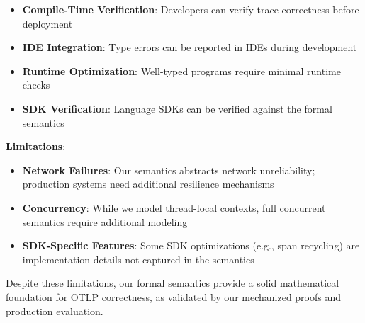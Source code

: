 \begin{itemize}
\item \textbf{Compile-Time Verification}: Developers can verify trace correctness before deployment
\item \textbf{IDE Integration}: Type errors can be reported in IDEs during development
\item \textbf{Runtime Optimization}: Well-typed programs require minimal runtime checks
\item \textbf{SDK Verification}: Language SDKs can be verified against the formal semantics
\end{itemize}

\textbf{Limitations}:

\begin{itemize}
\item \textbf{Network Failures}: Our semantics abstracts network unreliability; production systems need additional resilience mechanisms
\item \textbf{Concurrency}: While we model thread-local contexts, full concurrent semantics require additional modeling
\item \textbf{SDK-Specific Features}: Some SDK optimizations (e.g., span recycling) are implementation details not captured in the semantics
\end{itemize}

Despite these limitations, our formal semantics provide a solid mathematical foundation for OTLP correctness, as validated by our mechanized proofs and production evaluation.

